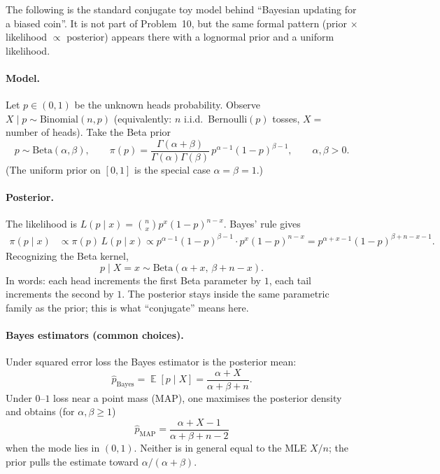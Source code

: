 \documentclass[11pt,a4paper]{article}
\DeclareMathOperator{\E}{\mathbb{E}}
\begin{document}
\begin{examnote}
\label{note:p10-beta-binomial}
The following is the standard conjugate toy model behind ``Bayesian updating for a biased coin''. It is not part of Problem~10, but the same formal pattern (prior \(\times\) likelihood \(\propto\) posterior) appears there with a lognormal prior and a uniform likelihood.

\paragraph{Model.}
Let \(p\in(0,1)\) be the unknown heads probability. Observe \(X\mid p\sim\mathrm{Binomial}(n,p)\) (equivalently: \(n\) i.i.d.\ Bernoulli\((p)\) tosses, \(X=\) number of heads). Take the Beta prior
\[
p\sim\mathrm{Beta}(\alpha,\beta),
\qquad
\pi(p)
=
\frac{\Gamma(\alpha+\beta)}{\Gamma(\alpha)\Gamma(\beta)}\,p^{\alpha-1}(1-p)^{\beta-1},
\qquad
\alpha,\beta>0.
\]
(The uniform prior on \([0,1]\) is the special case \(\alpha=\beta=1\).)

\paragraph{Posterior.}
The likelihood is \(L(p\mid x)=\binom{n}{x}p^x(1-p)^{n-x}\). Bayes' rule gives
\begin{align*}
\pi(p\mid x)
&\propto
\pi(p)\,L(p\mid x)
\propto
p^{\alpha-1}(1-p)^{\beta-1}\cdot p^x(1-p)^{n-x}
=
p^{\alpha+x-1}(1-p)^{\beta+n-x-1}.
\end{align*}
Recognizing the Beta kernel,
\[
p\mid X=x
\sim
\mathrm{Beta}(\alpha+x,\,\beta+n-x).
\]
In words: each head increments the first Beta parameter by \(1\), each tail increments the second by \(1\). The posterior stays inside the same parametric family as the prior; this is what ``conjugate'' means here.

\paragraph{Bayes estimators (common choices).}
Under squared error loss the Bayes estimator is the posterior mean:
\[
\widehat p_{\mathrm{Bayes}}
=
\E[p\mid X]
=
\frac{\alpha+X}{\alpha+\beta+n}.
\]
Under \(0\)--\(1\) loss near a point mass (MAP), one maximises the posterior density and obtains (for \(\alpha,\beta\ge 1\))
\[
\widehat p_{\mathrm{MAP}}
=
\frac{\alpha+X-1}{\alpha+\beta+n-2}
\]
when the mode lies in \((0,1)\). Neither is in general equal to the MLE \(X/n\); the prior pulls the estimate toward \(\alpha/(\alpha+\beta)\).


\end{examnote}
\end{document}
